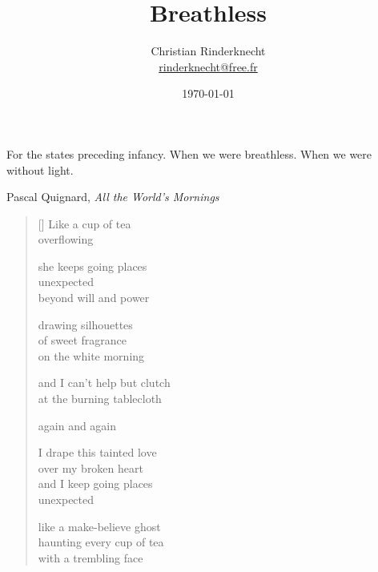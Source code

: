 \documentclass[12pt,a4paper]{article}
\title{Breathless}
\author{Christian Rinderknecht\\
{\small \url{rinderknecht@free.fr}}}
\date{\small\today}
\begin{document}
\maketitle

\epigraph{
  For the states preceding infancy. When we were breathless. When we
  were without light.}{Pascal Quignard,
  \emph{All the World's Mornings}}

\thispagestyle{empty}


\newpage\leavevmode\thispagestyle{empty}\newpage


\newpage

\poemtitle{}

\settowidth{\versewidth}{Like a make-believe ghost}

\bigskip

\begin{verse}[\versewidth]
  Like a cup of tea \\
  overflowing

  she keeps going places \\
  unexpected \\
  beyond will and power

  drawing silhouettes \\
  of sweet fragrance \\
  on the white morning

  and I can't help but clutch \\
  at the burning tablecloth

  again and again

  I drape this tainted love \\
  over my broken heart \\
  and I keep going places \\
  unexpected

  like a make-believe ghost \\
  haunting every cup of tea \\
  with a trembling face
\end{verse}


\newpage
\end{document}
